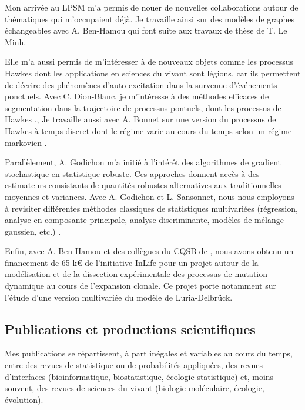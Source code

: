 \bigskip
Mon arrivée au LPSM m’a permis de nouer de nouvelles collaborations autour de thématiques qui m’occupaient déjà. Je travaille ainsi sur des modèles de graphes échangeables avec A. Ben-Hamou qui font suite aux travaux de thèse de T. Le Minh. 

Elle m’a aussi permis de m'intéresser à de nouveaux objets comme les processus Hawkes dont les applications en sciences du vivant sont légions, car ils permettent de décrire des phénomènes d’auto-excitation dans la survenue d’événements ponctuels. Avec C. Dion-Blanc, je m’intéresse à des méthodes efficaces de segmentation dans la trajectoire de processus pontuels, dont les processus de Hawkes \cite{DHL24}., Je travaille aussi avec A. Bonnet sur une version du processus de Hawkes à temps discret dont le régime varie au cours du temps selon un régime markovien \cite{BoR25}.

Parallèlement, A. Godichon m’a initié à l’intérêt des algorithmes de gradient stochastique en statistique robuste. Ces approches donnent accès à des estimateurs consistants de quantités robustes alternatives aux traditionnelles moyennes et variances. Avec A. Godichon et L. Sansonnet, nous nous employons à revisiter différentes méthodes classiques de statistiques multivariées (régression, analyse en composante principale, analyse discriminante, modèles de mélange gaussien, etc.) \cite{GoR24,GRS26,GGR26}.

Enfin, avec A. Ben-Hamou et des collègues du CQSB de \SU, nous avons obtenu un financement de 65 k\euro\xspace de l’initiative InLife pour un projet autour de la modélisation et de la dissection expérimentale des processus de mutation dynamique au cours de l'expansion clonale. Ce projet porte notamment sur l’étude d’une version multivariée du modèle de Luria-Delbrück.

\subsection{Publications et productions scientifiques}

Mes publications se répartissent, à part inégales et variables au cours du temps, entre des revues de statistique ou de probabilités appliquées, des revues d’interfaces (bioinformatique, biostatistique, écologie statistique) et, moins souvent, des revues de sciences du vivant (biologie moléculaire, écologie, évolution).

